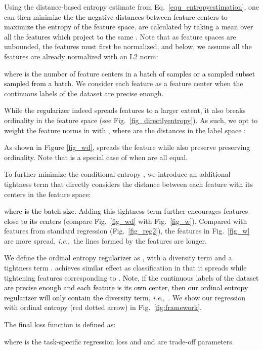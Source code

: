 \documentclass{article} \usepackage{iclr2023_conference,times}
\makeatletter
\newcommand*{\ie}{i.e.\@\xspace}
\def\ie{\mbox{\textit{i.e.}, }}
\def\shihao{\textcolor{black}}
\makeatother
\begin{document}
Using the distance-based entropy estimate from Eq.~\ref{equ_entropyestimation}, 
one can then minimize the 
\shihao{the negative distances between feature centers  to maximize the entropy of the feature space.  are calculated by taking a mean over all the features  which project to the same .}
Note that as feature spaces are unbounded, the features \shihao{} must first be normalized, and below, we assume all the features \shihao{} are already normalized with an L2 norm:




where  is the number of feature centers \shihao{in a batch of samples or a sampled subset sampled from a batch}. We consider each feature as a feature center when the continuous labels of the dataset are precise enough.

While the \shihao{regularizer}  indeed spreads features to a larger extent, it also breaks ordinality in the feature space (see Fig.~\ref{fig_directlyentropy}). As such, we opt to weight the feature norms in  with , where  are the distances in the label space :


As shown in Figure \ref{fig_wd},  spreads the feature while also preserve preserving ordinality.  Note that  is a special case of  when  are all equal.

To further minimize the conditional entropy , we introduce an additional tightness term that directly considers the distance between each feature  with 
\shihao{its} centers  in the feature space:

\shihao{where  is the batch size.} Adding this tightness term further encourages features \shihao{close to its centers} (compare Fig.~\ref{fig_wd} with Fig.~\ref{fig_w}).  
Compared with features from standard regression (Fig.~\ref{fig_reg2}), the features in Fig.~\ref{fig_w} are more spread, \ie the lines formed by the features are longer. 


We define the ordinal entropy \shihao{regularizer} as , with a diversity term  and a tightness term .  achieves similar effect as classification in that it spreads  while tightening features  corresponding to . \shihao{Note, if the continuous labels of the dataset are precise enough and each feature is its own center, then our ordinal entropy regularizer will only contain the diversity term, \ie .}
We show our regression with ordinal entropy (red dotted arrow) in Fig.~\ref{fig:framework}.

The final loss function  is defined as:

where  is the task-specific regression loss and  and  are trade-off parameters.
\end{document}
